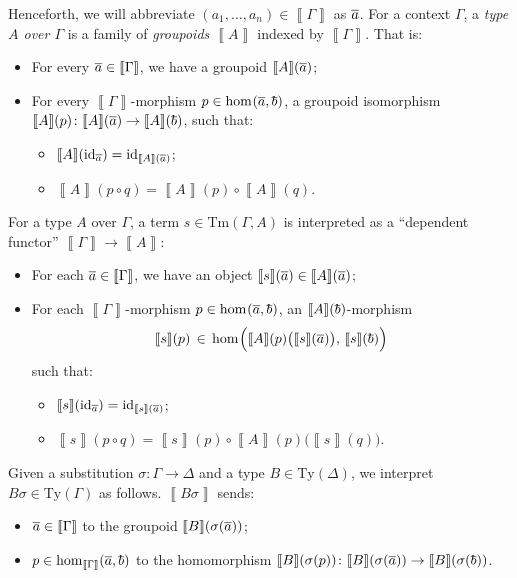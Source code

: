 \documentclass{article}
\theoremstyle{definition}
\renewcommand{\int}[1]{\mathopen{}\left\llbracket #1
    \right\rrbracket\mathclose{}}       %
\newcommand{\substType}[2]{#2#1}%
\newcommand{\Ty}{\mathrm{Ty}}
\newcommand{\Tm}{\mathrm{Tm}}
\renewcommand{\hom}[3][]{\mathrm{hom}_{#1}\mathopen{}\left( #2, #3 \right)\mathclose{}}
\DeclareMathOperator{\id}{id}				    %
\newcommand{\tup}[1]{\overline{\smash{#1}\vphantom{a}}}
\begin{document}
Henceforth, we will abbreviate $(a_1,\ldots,a_n) \in \int{\Gamma}$ as $\tup{a}$. For a context $\Gamma$, a \textit{type $A$ over $\Gamma$} is a family of \textit{groupoids} $\int{A}$ indexed by $\int{\Gamma}$. That is:
\begin{itemize}
    \item For every $\tup{a} \in \int{\Gamma}$, we have a groupoid $\int{A}(\tup{a})$;
    
    \item For every $\int{\Gamma}$-morphism $p \in \hom{\tup{a}}{\tup{b}}$, a groupoid isomorphism $\int{A}(p)\colon \int{A}(\tup{a}) \to \int{A}(\tup{b})$, such that:
    \begin{itemize}
        \item $\int{A}(\id_{\tup{a}}) = \id_{\int{A}(\tup{a})}$;
        
        \item $\int{A}(p \circ q) = \int{A}(p) \circ \int{A}(q)$.
    \end{itemize}
\end{itemize}

For a type $A$ over $\Gamma$, a term $s \in \Tm(\Gamma,A)$ is interpreted as a ``dependent functor'' $\int{\Gamma} \to \int{A}$:
\begin{itemize}
    \item For each $\tup{a} \in \int{\Gamma}$, we have an object $\int{s}(\tup{a}) \in \int{A}(\tup{a})$;
    
    \item For each $\int{\Gamma}$-morphism $p \in \hom{\tup{a}}{\tup{b}}$, an $\int{A}(\tup{b})$-morphism $$\int{s}(p)\, \in\, \hom{\Big.\int{A}(p) \big( \int{s}(\tup{a}) \big)}{\,\int{s}(\tup{b})}$$
    such that:
    \begin{itemize}
        \item $\int{s}(\id_{\tup{a}}) = \id_{\int{s}(\tup{a})}$;
        
        \item $\int{s}(p \circ q) = \int{s}(p) \circ \int{A}(p) \big( \int{s}(q) \big)$.
    \end{itemize}
\end{itemize}

Given a substitution $\sigma\colon \Gamma \to \Delta$ and a type $B \in \Ty(\Delta)$, we interpret $\substType{\sigma}{B} \in \Ty(\Gamma)$ as follows. $\int{\substType{\sigma}{B}}$ sends:
\begin{itemize}
    \item $\tup{a} \in \int{\Gamma}$ to the groupoid $\int{B}(\sigma(\tup{a}))$;
    
    \item $p \in \hom[\int{\Gamma}]{\tup{a}}{\tup{b}}$ to the homomorphism $\int{B}(\sigma(p))\colon \int{B}(\sigma(\tup{a})) \to \int{B}(\sigma(\tup{b}))$.
\end{itemize}
\end{document}

